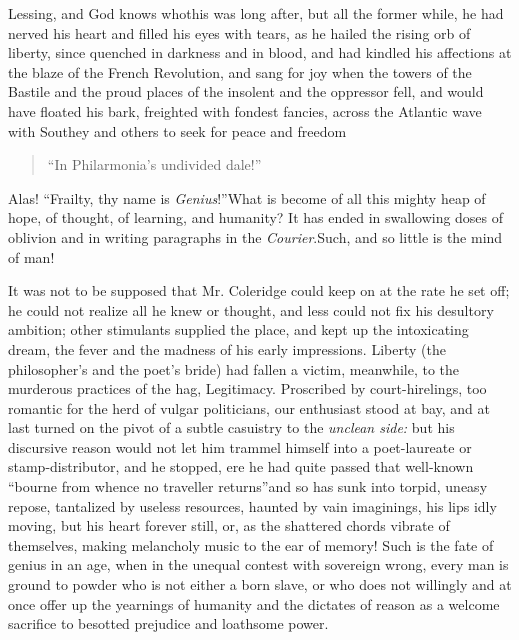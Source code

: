Lessing, and God knows who\textemdash this was long after, but all the
former while, he had nerved his heart and filled his eyes with
tears, as he hailed the rising orb of liberty, since quenched in
darkness and in blood, and had kindled his affections at the blaze
of the French Revolution, and sang for joy when the towers of the
Bastile and the proud places of the insolent and the oppressor
fell, and would have floated his bark, freighted with fondest
fancies, across the Atlantic wave with Southey and others to seek
for peace and freedom\textemdash 
\begin{quote}
  ``In Philarmonia's undivided dale!''
\end{quote}
Alas! ``Frailty, thy name is \emph{Genius}!''\textemdash What is become of all this
mighty heap of hope, of thought, of learning, and humanity? It has
ended in swallowing doses of oblivion and in writing paragraphs in
the \emph{Courier}.\textemdash Such, and so little is the mind of man!

It was not to be supposed that Mr. Coleridge could keep on at the
rate he set off; he could not realize all he knew or thought, and
less could not fix his desultory ambition; other stimulants
supplied the place, and kept up the intoxicating dream, the fever
and the madness of his early impressions. Liberty (the
philosopher's and the poet's bride) had fallen a victim,
meanwhile, to the murderous practices of the hag, Legitimacy.
Proscribed by court-hirelings, too romantic for the herd of vulgar
politicians, our enthusiast stood at bay, and at last turned on
the pivot of a subtle casuistry to the \emph{unclean side:} but his
discursive reason would not let him trammel himself into a
poet-laureate or stamp-distributor, and he stopped, ere he had
quite passed that well-known ``bourne from whence no traveller
returns''\textemdash and so has sunk into torpid, uneasy repose, tantalized
by useless resources, haunted by vain imaginings, his lips idly
moving, but his heart forever still, or, as the shattered chords
vibrate of themselves, making melancholy music to the ear of
memory! Such is the fate of genius in an age, when in the unequal
contest with sovereign wrong, every man is ground to powder who is
not either a born slave, or who does not willingly and at once
offer up the yearnings of humanity and the dictates of reason as a
welcome sacrifice to besotted prejudice and loathsome power.

